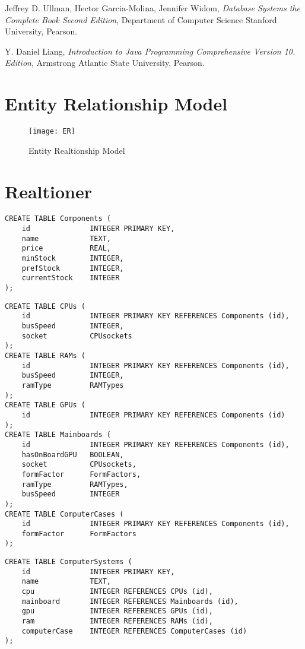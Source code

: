 \documentclass[a4paper]{article}
\begin{document}
\begin{thebibliography}{9}

    Jeffrey D. Ullman, Hector Garcia-Molina, Jennifer Widom,
    \emph{Database Systems the Complete Book Second Edition},
    Department of Computer Science Stanford University,
    Pearson.

    Y. Daniel Liang,
    \emph{Introduction to Java Programming Comprehensive Version 10. Edition},
    Armstrong Atlantic State University,
    Pearson.

\end{thebibliography}

\appendix

\section{Entity Relationship Model}
\label{appendix:er}

\begin{figure}[htbp!]
    \centering
    \texttt{[image: ER]}
    \caption{Entity Realtionship Model}
    \label{fig:er}
\end{figure}

\section{Realtioner}

\begin{verbatim}
CREATE TABLE Components (
    id              INTEGER PRIMARY KEY,
    name            TEXT,
    price           REAL,
    minStock        INTEGER,
    prefStock       INTEGER,
    currentStock    INTEGER
);
\end{verbatim}

\begin{verbatim}
CREATE TABLE CPUs (
    id              INTEGER PRIMARY KEY REFERENCES Components (id),
    busSpeed        INTEGER,
    socket          CPUsockets
);
CREATE TABLE RAMs (
    id              INTEGER PRIMARY KEY REFERENCES Components (id),
    busSpeed        INTEGER,
    ramType         RAMTypes
);
CREATE TABLE GPUs (
    id              INTEGER PRIMARY KEY REFERENCES Components (id)
);
CREATE TABLE Mainboards (
    id              INTEGER PRIMARY KEY REFERENCES Components (id),
    hasOnBoardGPU   BOOLEAN,
    socket          CPUsockets,
    formFactor      FormFactors,
    ramType         RAMTypes,
    busSpeed        INTEGER
);
CREATE TABLE ComputerCases (
    id              INTEGER PRIMARY KEY REFERENCES Components (id),
    formFactor      FormFactors
);
\end{verbatim}

\begin{verbatim}
CREATE TABLE ComputerSystems (
    id              INTEGER PRIMARY KEY,
    name            TEXT,
    cpu             INTEGER REFERENCES CPUs (id),
    mainboard       INTEGER REFERENCES Mainboards (id),
    gpu             INTEGER REFERENCES GPUs (id),
    ram             INTEGER REFERENCES RAMs (id),
    computerCase    INTEGER REFERENCES ComputerCases (id)
);
\end{verbatim}
\end{document}
